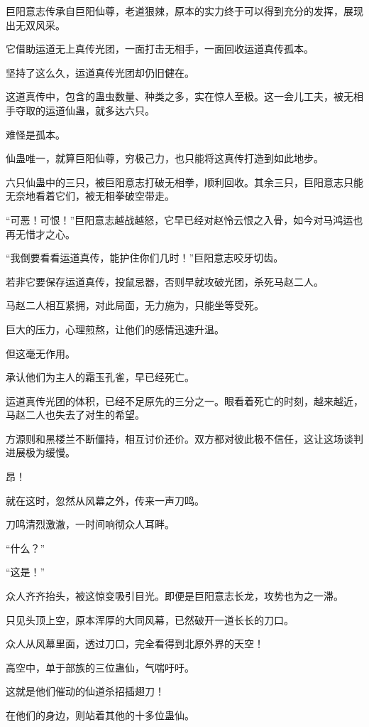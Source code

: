 \begin{this_body}
巨阳意志传承自巨阳仙尊，老道狠辣，原本的实力终于可以得到充分的发挥，展现出无双风采。

它借助运道无上真传光团，一面打击无相手，一面回收运道真传孤本。

坚持了这么久，运道真传光团却仍旧健在。

这道真传中，包含的蛊虫数量、种类之多，实在惊人至极。这一会儿工夫，被无相手夺取的运道仙蛊，就多达六只。

难怪是孤本。

仙蛊唯一，就算巨阳仙尊，穷极己力，也只能将这真传打造到如此地步。

六只仙蛊中的三只，被巨阳意志打破无相拳，顺利回收。其余三只，巨阳意志只能无奈地看着它们，被无相拳破空带走。

“可恶！可恨！”巨阳意志越战越怒，它早已经对赵怜云恨之入骨，如今对马鸿运也再无惜才之心。

“我倒要看看运道真传，能护住你们几时！”巨阳意志咬牙切齿。

若非它要保存运道真传，投鼠忌器，否则早就攻破光团，杀死马赵二人。

马赵二人相互紧拥，对此局面，无力施为，只能坐等受死。

巨大的压力，心理煎熬，让他们的感情迅速升温。

但这毫无作用。

承认他们为主人的霜玉孔雀，早已经死亡。

运道真传光团的体积，已经不足原先的三分之一。眼看着死亡的时刻，越来越近，马赵二人也失去了对生的希望。

方源则和黑楼兰不断僵持，相互讨价还价。双方都对彼此极不信任，这让这场谈判进展极为缓慢。

昂！

就在这时，忽然从风幕之外，传来一声刀鸣。

刀鸣清烈激澈，一时间响彻众人耳畔。

“什么？”

“这是！”

众人齐齐抬头，被这惊变吸引目光。即便是巨阳意志长龙，攻势也为之一滞。

只见头顶上空，原本浑厚的大同风幕，已然破开一道长长的刀口。

众人从风幕里面，透过刀口，完全看得到北原外界的天空！

高空中，单于部族的三位蛊仙，气喘吁吁。

这就是他们催动的仙道杀招插翅刀！

在他们的身边，则站着其他的十多位蛊仙。


\end{this_body}
